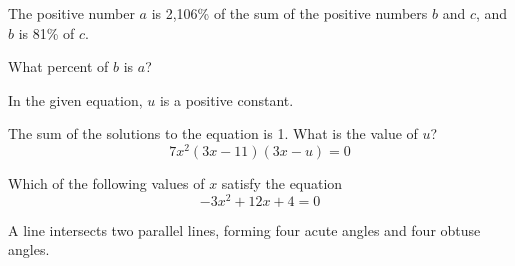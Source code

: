 \vspace{0.75em}


\vspace{2em}
\newpage

\noindent\markforreview
\vspace{1em}

The positive number \(a\) is 2,106\% of the sum of the positive numbers \(b\) and \(c\), and \(b\) is 81\% of \(c\).

What percent of \(b\) is \(a\)?

\vspace{0.75em}


\vspace{2em}
\newpage

\noindent\markforreview
\vspace{1em}

In the given equation, \(u\) is a positive constant.

The sum of the solutions to the equation is 1. What is the value of \(u\)?
\[
7x^2(3x - 11)(3x - u) = 0
\]

\vspace{0.75em}


\vspace{2em}
\newpage

\noindent\markforreview
\vspace{1em}

Which of the following values of \(x\) satisfy the equation
\[
-3x^2 + 12x + 4 = 0
\]

\vspace{0.75em}


\vspace{2em}
\newpage

\noindent\markforreview
\vspace{1em}

A line intersects two parallel lines, forming four acute angles and four obtuse angles.

